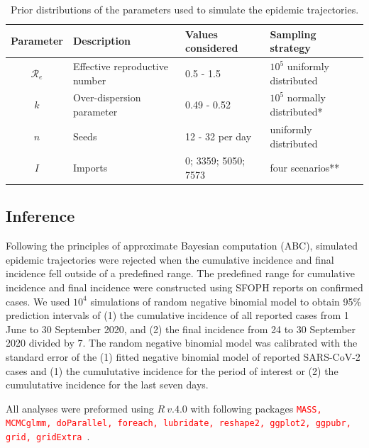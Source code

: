 \documentclass[10pt, a4paper, twoside]{article}
\begin{document}
\begin{multicols}{2}
\begin{table}
	\caption{Prior distributions of the parameters used to simulate the epidemic trajectories.}%
	\label{t1}
\begin{tabular}{clll}
	\hline
	Parameter & Description & Values considered & Sampling strategy\\
	\hline
	$\mathcal{R}_e$ & Effective reproductive number & 0.5 - 1.5 & $10^5$ uniformly distributed\\
	$k$ & Over-dispersion parameter & 0.49 - 0.52 & $10^5$ normally distributed*\\
	$n$ & Seeds & 12 - 32 per day & uniformly distributed\\
	$I$ & Imports & 0; 3359; 5050; 7573 & four scenarios**\\
	\hline
\end{tabular}

\end{table}

\subsection{Inference}
Following the principles of approximate Bayesian computation (ABC), simulated epidemic trajectories were rejected when the cumulative incidence and final incidence fell outside of a predefined range.
The predefined range for cumulative incidence and final incidence were constructed using SFOPH reports on confirmed cases.
We used $10^4$ simulations of random negative binomial model to obtain 95\% prediction intervals of (1) the cumulative incidence of all reported cases from 1 June to 30 September 2020, and (2) the final incidence from 24 to 30 September 2020 divided by 7.
The random negative binomial model was calibrated with the standard error of the (1) fitted negative binomial model of reported SARS-CoV-2 cases and (1) the cumulutative incidence for the period of interest or (2) the cumulutative incidence for the last seven days.


All analyses were preformed using $R ~v.4.0$ with following packages \textcolor{red}{\texttt{MASS, MCMCglmm, doParallel, foreach, lubridate, reshape2, ggplot2, ggpubr, grid, gridExtra }}.\cite{r_core_team_r_2020,venables_modern_2002}


\end{multicols}
\end{document}
